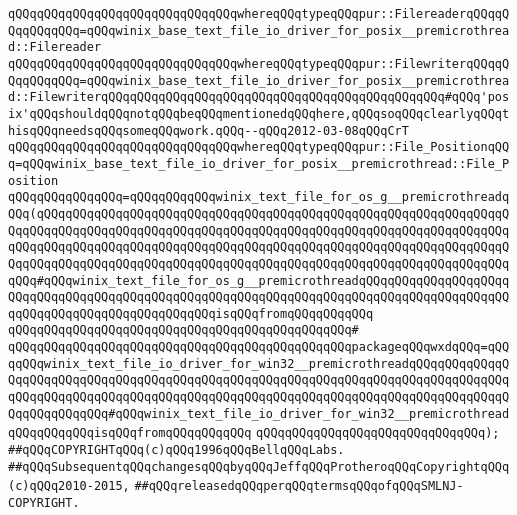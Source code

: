 \verb|qQQqqQQqqQQqqQQqqQQqqQQqqQQqqQQqwhereqQQqtypeqQQqpur::FilereaderqQQqqQQqqQQqqQQq=qQQqwinix_base_text_file_io_driver_for_posix__premicrothread::Filereader|\newline
\verb|qQQqqQQqqQQqqQQqqQQqqQQqqQQqqQQqwhereqQQqtypeqQQqpur::FilewriterqQQqqQQqqQQqqQQq=qQQqwinix_base_text_file_io_driver_for_posix__premicrothread::FilewriterqQQqqQQqqQQqqQQqqQQqqQQqqQQqqQQqqQQqqQQqqQQqqQQq#qQQq'posix'qQQqshouldqQQqnotqQQqbeqQQqmentionedqQQqhere,qQQqsoqQQqclearlyqQQqthisqQQqneedsqQQqsomeqQQqwork.qQQq--qQQq2012-03-08qQQqCrT|\newline
\verb|qQQqqQQqqQQqqQQqqQQqqQQqqQQqqQQqwhereqQQqtypeqQQqpur::File_PositionqQQq=qQQqwinix_base_text_file_io_driver_for_posix__premicrothread::File_Position|\newline
\newline
\verb|qQQqqQQqqQQqqQQq=qQQqqQQqqQQqwinix_text_file_for_os_g__premicrothreadqQQq(qQQqqQQqqQQqqQQqqQQqqQQqqQQqqQQqqQQqqQQqqQQqqQQqqQQqqQQqqQQqqQQqqQQqqQQqqQQqqQQqqQQqqQQqqQQqqQQqqQQqqQQqqQQqqQQqqQQqqQQqqQQqqQQqqQQqqQQqqQQqqQQqqQQqqQQqqQQqqQQqqQQqqQQqqQQqqQQqqQQqqQQqqQQqqQQqqQQqqQQqqQQqqQQqqQQqqQQqqQQqqQQqqQQqqQQqqQQqqQQqqQQqqQQqqQQqqQQqqQQqqQQqqQQqqQQqqQQqqQQq#qQQqwinix_text_file_for_os_g__premicrothreadqQQqqQQqqQQqqQQqqQQqqQQqqQQqqQQqqQQqqQQqqQQqqQQqqQQqqQQqqQQqqQQqqQQqqQQqqQQqqQQqqQQqqQQqqQQqqQQqqQQqqQQqqQQqqQQqqQQqqQQqisqQQqfromqQQqqQQqqQQq|\newline
\verb|qQQqqQQqqQQqqQQqqQQqqQQqqQQqqQQqqQQqqQQqqQQqqQQq#|\newline
\verb|qQQqqQQqqQQqqQQqqQQqqQQqqQQqqQQqqQQqqQQqqQQqqQQqpackageqQQqwxdqQQq=qQQqqQQqwinix_text_file_io_driver_for_win32__premicrothreadqQQqqQQqqQQqqQQqqQQqqQQqqQQqqQQqqQQqqQQqqQQqqQQqqQQqqQQqqQQqqQQqqQQqqQQqqQQqqQQqqQQqqQQqqQQqqQQqqQQqqQQqqQQqqQQqqQQqqQQqqQQqqQQqqQQqqQQqqQQqqQQqqQQqqQQqqQQqqQQqqQQqqQQq#qQQqwinix_text_file_io_driver_for_win32__premicrothreadqQQqqQQqqQQqisqQQqfromqQQqqQQqqQQq|\newline
\verb|qQQqqQQqqQQqqQQqqQQqqQQqqQQqqQQq);|\newline
\newline
\newline
\newline
\verb|##qQQqCOPYRIGHTqQQq(c)qQQq1996qQQqBellqQQqLabs.|\newline
\verb|##qQQqSubsequentqQQqchangesqQQqbyqQQqJeffqQQqProtheroqQQqCopyrightqQQq(c)qQQq2010-2015,|\newline
\verb|##qQQqreleasedqQQqperqQQqtermsqQQqofqQQqSMLNJ-COPYRIGHT.|\newline


